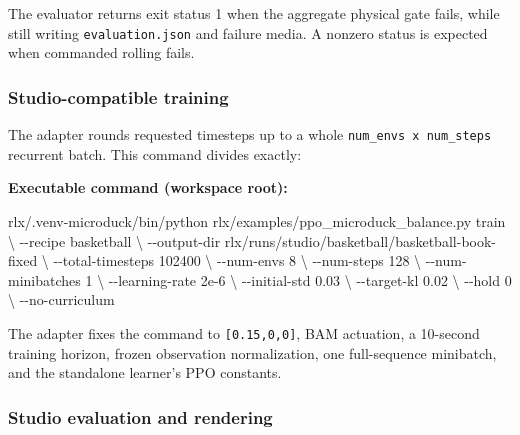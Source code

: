 \documentclass[
  american,
  11pt,
  letterpaper,
]{article}
\newenvironment{Shaded}{\begin{snugshade}}{\end{snugshade}}
\newcommand{\AttributeTok}[1]{\textcolor[rgb]{0.13,0.29,0.53}{#1}}
\newcommand{\DataTypeTok}[1]{\textcolor[rgb]{0.13,0.29,0.53}{#1}}
\newcommand{\ExtensionTok}[1]{#1}
\newcommand{\NormalTok}[1]{#1}
\renewenvironment{Shaded}{\par\smallskip}{\par\smallskip}
\begin{document}
The evaluator returns exit status 1 when the aggregate physical gate
fails, while still writing \texttt{evaluati\allowbreak{}on.json} and
failure media. A nonzero status is expected when commanded rolling
fails.

\subsubsection{Studio-compatible
training}\label{studio-compatible-training}

The adapter rounds requested timesteps up to a whole
\texttt{num\_envs\ x\ num\_steps} recurrent batch. This command divides
exactly:

\textbf{Executable command (workspace root):}

\begin{Shaded}
\begin{Highlighting}[]
\ExtensionTok{rlx/.venv{-}microduck/bin/python}\NormalTok{ rlx/examples/ppo\_microduck\_balance.py train }\DataTypeTok{\textbackslash{}}
  \AttributeTok{{-}{-}recipe}\NormalTok{ basketball }\DataTypeTok{\textbackslash{}}
  \AttributeTok{{-}{-}output{-}dir}\NormalTok{ rlx/runs/studio/basketball/basketball{-}book{-}fixed }\DataTypeTok{\textbackslash{}}
  \AttributeTok{{-}{-}total{-}timesteps}\NormalTok{ 102400 }\DataTypeTok{\textbackslash{}}
  \AttributeTok{{-}{-}num{-}envs}\NormalTok{ 8 }\DataTypeTok{\textbackslash{}}
  \AttributeTok{{-}{-}num{-}steps}\NormalTok{ 128 }\DataTypeTok{\textbackslash{}}
  \AttributeTok{{-}{-}num{-}minibatches}\NormalTok{ 1 }\DataTypeTok{\textbackslash{}}
  \AttributeTok{{-}{-}learning{-}rate}\NormalTok{ 2e{-}6 }\DataTypeTok{\textbackslash{}}
  \AttributeTok{{-}{-}initial{-}std}\NormalTok{ 0.03 }\DataTypeTok{\textbackslash{}}
  \AttributeTok{{-}{-}target{-}kl}\NormalTok{ 0.02 }\DataTypeTok{\textbackslash{}}
  \AttributeTok{{-}{-}hold}\NormalTok{ 0 }\DataTypeTok{\textbackslash{}}
  \AttributeTok{{-}{-}no{-}curriculum}
\end{Highlighting}
\end{Shaded}

The adapter fixes the command to \texttt{{[}0.15,0,0{]}}, BAM actuation,
a 10-second training horizon, frozen observation normalization, one
full-sequence minibatch, and the standalone learner's PPO constants.

\subsubsection{Studio evaluation and
rendering}\label{studio-evaluation-and-rendering}
\end{document}
